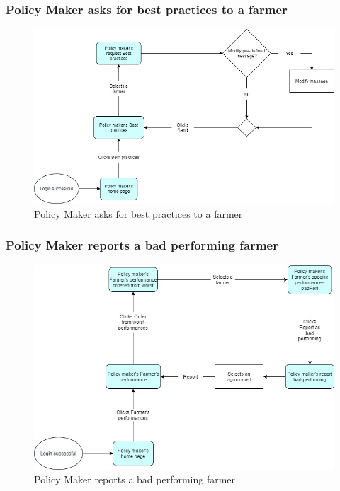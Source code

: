 \documentclass{article}
\begin{document}
        
        
        \subsubsection{Policy Maker asks for best practices to a farmer}
            \begin{figure} [h]
                \centering
                \includegraphics[width=1\textwidth]{images/UserInterfaces/MapsFunctionalities/22. PolicyMakerAsksForBestPractices.jpg}
                \caption{\label{fig:PolicyMakerAskBestPractice}Policy Maker asks for best practices to a farmer}
            \end{figure}
    
        \newpage
        
        
        \subsubsection{Policy Maker reports a bad performing farmer}
            \begin{figure} [h]
                \centering
                \includegraphics[width=1\textwidth]{images/UserInterfaces/MapsFunctionalities/23. PolicyMakerReportsBadPerformingFarmer.jpg}
                \caption{\label{fig:PolicyMakerReportsBadFarmer}Policy Maker reports a bad performing farmer}
            \end{figure}
    
\end{document}
